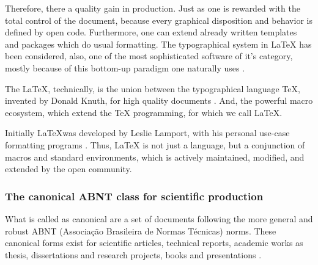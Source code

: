 \documentclass[
12pt,				%
openright,			%
oneside,			%
a4paper,			%
brazil,				%
english,			  %
]{abntex2}
\begin{document}
Therefore, there a quality gain in production. Just as one is rewarded
with the total control of the document, because every graphical
disposition and behavior is defined by open code. Furthermore, one can
extend already written templates and packages which do usual
formatting. The typographical system in \LaTeX{} has been considered,
also, one of the most sophisticated software of it's category, mostly
because of this bottom-up paradigm one naturally uses \cite{haralambous2007}.

The \LaTeX{}, technically, is the union between the typographical
language \TeX{}, invented by Donald Knuth, for high quality documents
\cite{knuth1986}. And, the powerful macro ecosystem, which extend the \TeX{}
programming, for which we call \LaTeX{}.

Initially \LaTeX was developed by Leslie Lamport, with his personal
use-case formatting programs \cite{lamport1994}. Thus, \LaTeX{} is not
just a language, but a conjunction of macros and standard
environments, which is actively maintained, modified, and extended by
the open community.

\subsubsection{The canonical ABNT class for scientific production}

What is called as canonical are a set of documents following the more
general and robust ABNT (Associação Brasileira de Normas Técnicas)
norms. These canonical forms exist for scientific articles, technical
reports, academic works as thesis, dissertations and research
projects, books and presentations \cite{abntex2012}. 
\end{document}
